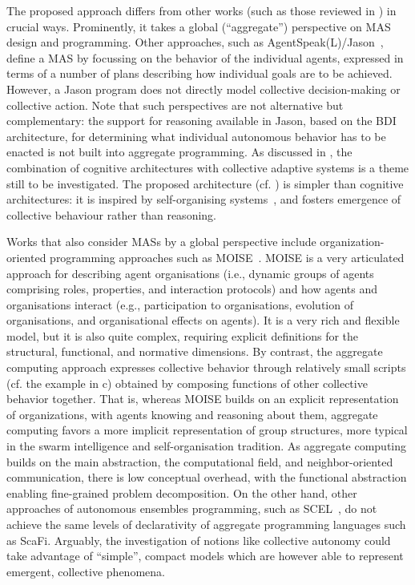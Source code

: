 \documentclass[jsan,article,accept,moreauthors,pdftex]{Definitions/mdpi}
\begin{document}
\begin{paracol}{2}
{
The proposed approach differs from other works (such as those reviewed in ) 
 in crucial ways.
%
Prominently, it takes a global (``aggregate'') perspective on MAS design and programming.
%
Other approaches, such as AgentSpeak(L)/Jason~\cite{bordini2007programming-mas-agentspeak},
 define a MAS by focussing on the behavior of the individual agents,
 expressed in terms of a number of {plans}
 describing how individual goals are to be achieved.
%
However, a Jason program does not directly model collective decision-making or collective action.
%
Note that such perspectives are not alternative but complementary:
 the support for reasoning available in Jason, based on the BDI architecture, 
 for determining what individual autonomous behavior has to be enacted
 is not built into aggregate programming.
%
As discussed in ,
 the combination of cognitive architectures
 with collective adaptive systems
 is a theme still to be investigated.
%
The proposed architecture (cf. )
 is simpler than cognitive architectures:
 it is inspired by self-organising systems~\cite{DBLP:series/ncs/RodriguezHGGK11},
 and fosters {emergence} of collective behaviour
 rather than reasoning.

Works that also consider MASs by a global perspective 
 include organization-oriented programming approaches
 such as MOISE~\cite{DBLP:journals/ijaose/HubnerSB07}.
%
MOISE is a very articulated approach 
 for describing agent {organisations}
 (i.e., dynamic {groups} of agents
 comprising roles, properties, and interaction protocols) 
 and 
 how agents and organisations interact
 (e.g., participation to organisations, 
 evolution of organisations,
 and organisational effects on agents).
%
It is a very rich and flexible model, but it is also quite complex,
 requiring explicit definitions for the
 structural, functional, and normative dimensions.
%
By contrast,
 the aggregate computing approach 
 expresses collective behavior
 through relatively small scripts
 (cf. the example in c)
 obtained by composing functions of other collective behavior together.
%
That is, whereas MOISE builds on 
 an explicit representation of organizations,
 with agents knowing and reasoning about them,
 aggregate computing favors a more implicit 
 representation of group structures, 
 more typical in the swarm intelligence and self-organisation tradition.
%
As aggregate computing builds on the main abstraction,
 the computational field,
 and neighbor-oriented communication,
 there is low conceptual overhead,
 with the functional abstraction enabling fine-grained problem decomposition.
%
On the other hand, 
 other approaches of autonomous {ensembles} programming,
 such as SCEL~\cite{DBLP:journals/taas/NicolaLPT14},
 do not achieve the same levels of declarativity
 of aggregate programming languages such as ScaFi.
%
Arguably, the investigation of notions like collective autonomy 
 could take advantage of ``simple'', compact models 
 which are however able to represent emergent, collective phenomena.
}


\end{paracol}
\end{document}
